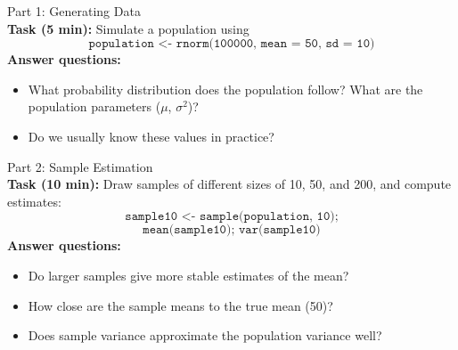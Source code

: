 \documentclass[main.tex]{subfiles}
\begin{document}
\begin{frame}
\begin{block}{Part 1: Generating Data\\}
\textbf{Task (5 min):} Simulate a population using $$\texttt{population <- rnorm(100000, mean = 50, sd = 10)}$$
\textbf{Answer questions:}
\begin{itemize}
  \item What probability distribution does the population follow? What are the population parameters ($\mu$, $\sigma^2$)?
  \item Do we usually know these values in practice?
\end{itemize}
\end{block}
\end{frame}

\begin{frame}
\begin{block}{Part 2: Sample Estimation\\}
\textbf{Task (10 min):} Draw samples of different sizes of 10, 50, and 200, and compute estimates:\\
 $$\texttt{sample10 <- sample(population, 10);}$$
$$\texttt{mean(sample10);  var(sample10)}$$
\textbf{Answer questions:}
\begin{itemize}
  \item Do larger samples give more stable estimates of the mean?
  \item How close are the sample means to the true mean (50)?
  \item Does sample variance approximate the population variance well?
\end{itemize}
\end{block}
\end{frame}
\end{document}
